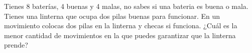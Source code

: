 \begin{problem}
    [\href{https://www.instagram.com/reel/DEf5ujGvvK7/?igsh=M3FjbDQwZGxndWFi}{IG Reels}]
    Tienes 8 bater\'ias, 4 buenas y 4 malas, no sabes si una bateria es buena o mala. Tienes una linterna que ocupa dos pilas buenas para funcionar. En un movimiento colocas dos pilas en la linterna y checas si funciona. ¿Cuál es la menor cantidad de movimientos en la que puedes garantizar que la linterna prende?

    \label{UNK4}
\end{problem}